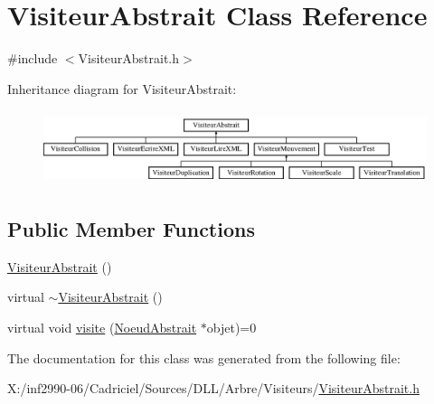 \hypertarget{class_visiteur_abstrait}{\section{Visiteur\-Abstrait Class Reference}
\label{class_visiteur_abstrait}
}


{\ttfamily \#include $<$Visiteur\-Abstrait.\-h$>$}

Inheritance diagram for Visiteur\-Abstrait\-:\begin{figure}[H]
\begin{center}
\leavevmode
\includegraphics[height=2.187500cm]{class_visiteur_abstrait}
\end{center}
\end{figure}
\subsection*{Public Member Functions}
\begin{DoxyCompactItemize}
\item 
\hyperlink{group__inf2990_gab30d8c699bab1b4538f79e5750468d2d}{Visiteur\-Abstrait} ()
\item 
virtual \hyperlink{group__inf2990_gaa7cfb10eab849f240ee4cb45af35df2e}{$\sim$\-Visiteur\-Abstrait} ()
\item 
virtual void \hyperlink{group__inf2990_ga95fe9e57ad3c13fdf25df8b36cd31f9b}{visite} (\hyperlink{class_noeud_abstrait}{Noeud\-Abstrait} $\ast$objet)=0
\end{DoxyCompactItemize}


The documentation for this class was generated from the following file\-:\begin{DoxyCompactItemize}
\item 
X\-:/inf2990-\/06/\-Cadriciel/\-Sources/\-D\-L\-L/\-Arbre/\-Visiteurs/\hyperlink{_visiteur_abstrait_8h}{Visiteur\-Abstrait.\-h}\end{DoxyCompactItemize}

